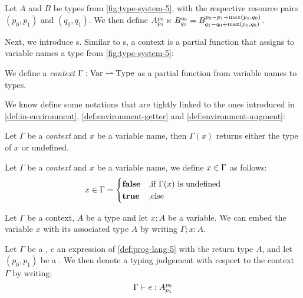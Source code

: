 \begin{definition}
   Let \(A\) and \(B\) be types from \cref{fig:type-system-5}, with the respective resource pairs \((p_0, p_1)\) and \((q_0, q_1)\). We then define \(A ^{p_0}_{p_1} \ltimes B ^{q_0}_{q_1} = B ^{p_0 - p_1 + \max(p_1, q_0)}_{q_1 - q_0 + \max(p_1, q_0)}\).
\end{definition}

Next, we introduce s. Similar to s, a context is a partial function that assigns to variable names a type from \cref{fig:type-system-5}:

\begin{definition}[Context]\label{def:context}
   We define a \emph{context} \(\Gamma : \text{Var} \rightharpoonup \text{Type}\) as a partial function from variable names to types.
\end{definition}

We know define some notations that are tightly linked to the ones introduced in \cref{def:in-environment}, \cref{def:environment-getter} and \cref{def:environment-augment}:


\begin{definition}\label{def:context-getter}
   Let \(\Gamma\) be a \emph{context} and \(x\) be a variable name, then \(\Gamma(x)\) returns either the type of \(x\) or undefined.
\end{definition}

\begin{definition}\label{def:in-context}
   Let \(\Gamma\) be a \emph{context} and \(x\) be a variable name, we define \(x \in \Gamma\) as follows:
   \[
      x \in \Gamma =
      \begin{cases}
	 \mathbf{false}	     & \text{,if } \Gamma(x) \text{ is undefined}\\
	 \mathbf{true}	     & \text{,else}
      \end{cases}
   \]
\end{definition}

\begin{definition}\label{def:context-augment}
   Let \(\Gamma\) be a context, \(A\) be a type and let \(x : A\) be a variable. We can embed the variable \(x\) with its associated type \(A\) by writing \(\Gamma ; x:A\).
\end{definition}

\begin{definition}\label{def:type-judgement-context}
   Let \(\Gamma\) be a , \(e\) an expression of \cref{def:prog-lang-5} with the return type \(A\), and let \((p_0, p_1)\) be a . We then denote a typing judgement with respect to the context \(\Gamma\) by writing:
   \[
      \Gamma \vdash e : A ^{p_0}_{p_1}
   \]
\end{definition}

